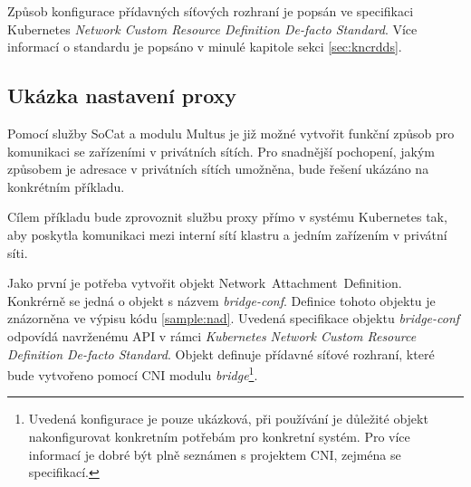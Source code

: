 Způsob konfigurace přídavných síťových rozhraní je popsán ve specifikaci Kubernetes \textit{Network Custom Resource Definition De-facto Standard}. Více informací o standardu je popsáno v minulé kapitole sekci \ref{sec:kncrdds}.


\subsection{Ukázka nastavení proxy}\label{ukazkaProxy}
Pomocí služby SoCat a modulu Multus je již možné vytvořit funkční způsob pro komunikaci se zařízeními v privátních sítích. Pro snadnější pochopení, jakým způsobem je adresace v privátních sítích umožněna, bude řešení ukázáno na konkrétním příkladu.

Cílem příkladu bude zprovoznit službu proxy přímo v systému Kubernetes tak, aby poskytla komunikaci mezi interní sítí klastru a jedním zařízením v privátní síti.

Jako první je potřeba vytvořit objekt Network~Attachment~Definition. Konkrérně se jedná o objekt s názvem \textit{bridge-conf}. Definice tohoto objektu je znázorněna ve výpisu kódu \ref{sample:nad}. Uvedená specifikace objektu \textit{bridge-conf} odpovídá navrženému API v rámci  \textit{Kubernetes Network Custom Resource Definition De-facto Standard}. Objekt definuje přídavné síťové rozhraní, které bude vytvořeno pomocí CNI modulu \textit{bridge}\footnote{Uvedená konfigurace je pouze ukázková, při používání je důležité objekt nakonfigurovat konkretním potřebám pro konkretní systém. Pro více informací je dobré být plně seznámen s projektem CNI, zejména se specifikací.}.

